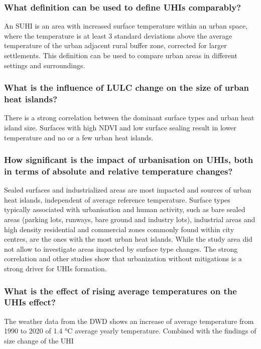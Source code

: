 \documentclass[12pt,a4paper, english,twoside]{scrartcl}
\begin{document}
 \subsubsection{What definition can be used to define \glspl{UHI} comparably?}\label{a1} 
        An \gls{SUHI} is an area with increased surface temperature within an urban space, where the temperature is at least 3 standard deviations above the average temperature of the urban adjacent rural buffer zone, corrected for larger settlements. 
        This definition can be used to compare urban areas in different settings and surroundings. 
 \subsubsection{What is the influence of \gls{LULC} change on the size of urban heat islands?}\label{a2}
  There is a strong correlation between the dominant surface types and urban heat island size. 
  Surfaces with high NDVI and low surface sealing result in lower temperature and no or a few urban heat islands. 
  
 \subsubsection{How significant is the impact of urbanisation on \glspl{UHI}, both in terms of absolute and relative temperature changes?}\label{a3}
  Sealed surfaces and industrialized areas are most impacted and sources of urban heat islands, independent of average reference temperature.
  Surface types typically associated with urbanisation and human activity, such as bare sealed areas (parking lots, runways, bare ground and industry lots), industrial areas and high density residential and commercial zones commonly found within city centres, are the ones with the most urban heat islands.
  While the study area did not allow to investigate areas impacted by surface type changes. The strong correlation and other studies show that urbanization without mitigations is a strong driver for \glspl{UHI} formation.
  
 \subsubsection{What is the effect of rising average temperatures on the \glspl{UHI} effect?}\label{a4}
  The weather data from the \gls{DWD} shows an increase of average temperature from 1990 to 2020 of 1.4 °C average yearly temperature. 
  Combined with the findings of size change of the \gls{UHI} 
\end{document}
